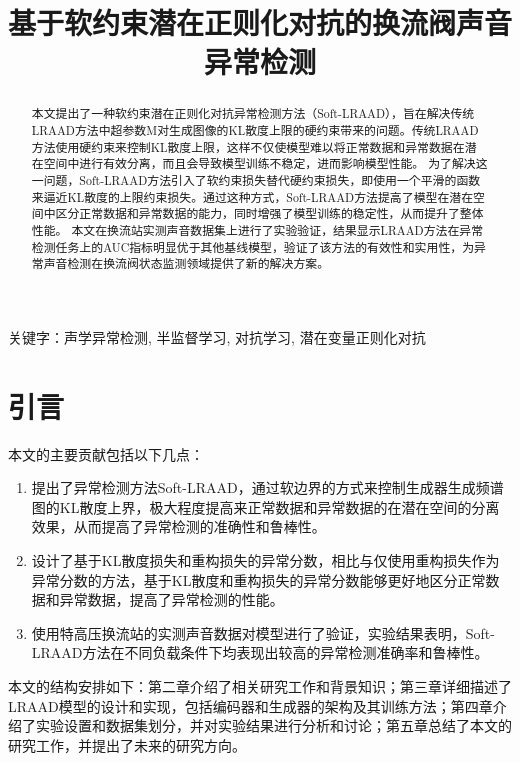 \documentclass{article}
\title{基于软约束潜在正则化对抗的换流阀声音异常检测}
\begin{document}
\maketitle

\begin{abstract}
  本文提出了一种软约束潜在正则化对抗异常检测方法（Soft-LRAAD），旨在解决传统LRAAD方法中超参数M对生成图像的KL散度上限的硬约束带来的问题。传统LRAAD方法使用硬约束来控制KL散度上限，这样不仅使模型难以将正常数据和异常数据在潜在空间中进行有效分离，而且会导致模型训练不稳定，进而影响模型性能。
  为了解决这一问题，Soft-LRAAD方法引入了软约束损失替代硬约束损失，即使用一个平滑的函数来逼近KL散度的上限约束损失。通过这种方式，Soft-LRAAD方法提高了模型在潜在空间中区分正常数据和异常数据的能力，同时增强了模型训练的稳定性，从而提升了整体性能。
本文在换流站实测声音数据集上进行了实验验证，结果显示LRAAD方法在异常检测任务上的AUC指标明显优于其他基线模型，验证了该方法的有效性和实用性，为异常声音检测在换流阀状态监测领域提供了新的解决方案。
\end{abstract}


关键字：声学异常检测, 半监督学习, 对抗学习, 潜在变量正则化对抗

\section{引言}


本文的主要贡献包括以下几点：

\begin{enumerate}

  \item 提出了异常检测方法Soft-LRAAD，通过软边界的方式来控制生成器生成频谱图的KL散度上界，极大程度提高来正常数据和异常数据的在潜在空间的分离效果，从而提高了异常检测的准确性和鲁棒性。

  \item 设计了基于KL散度损失和重构损失的异常分数，相比与仅使用重构损失作为异常分数的方法，基于KL散度和重构损失的异常分数能够更好地区分正常数据和异常数据，提高了异常检测的性能。

  \item 使用特高压换流站的实测声音数据对模型进行了验证，实验结果表明，Soft-LRAAD方法在不同负载条件下均表现出较高的异常检测准确率和鲁棒性。

\end{enumerate}

本文的结构安排如下：第二章介绍了相关研究工作和背景知识；第三章详细描述了LRAAD模型的设计和实现，包括编码器和生成器的架构及其训练方法；第四章介绍了实验设置和数据集划分，并对实验结果进行分析和讨论；第五章总结了本文的研究工作，并提出了未来的研究方向。
\end{document}
